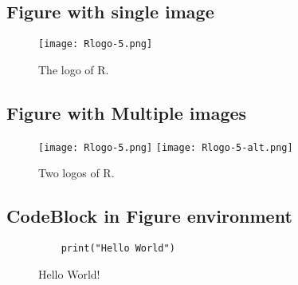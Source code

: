 

\subsection{Figure with single image}

\begin{figure}[htbp]
    \centering
    \texttt{[image: Rlogo-5.png]}
    \caption{The logo of R.}
    \label{figure:rlogo}
\end{figure}

\subsection{Figure with Multiple images}

\begin{figure}[htbp]
    \centering
    \texttt{[image: Rlogo-5.png]}
    \texttt{[image: Rlogo-5-alt.png]}
    \caption{Two logos of R.}
    \label{figure:rlogo2}
\end{figure}

\subsection{CodeBlock in Figure environment}

\begin{figure}[htbp]
    \centering
    \begin{verbatim}
    print("Hello World")
    \end{verbatim}
    \caption{Hello World!}
    \label{code:helloworld}
\end{figure}




